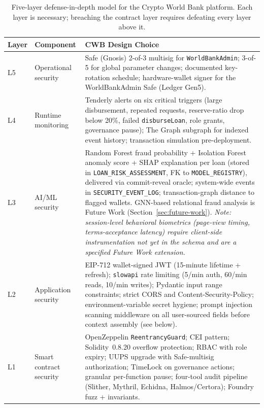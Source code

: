 \documentclass[12pt,a4paper]{report}
\newcommand{\tableheadcolor}{\rowcolor{TableHeadBg}}
\begin{document}
\begin{table}[H]
\centering
\caption[Five-layer defense-in-depth model]{Five-layer defense-in-depth model for the Crypto World Bank platform. Each layer is necessary; breaching the contract layer requires defeating every layer above it.}
\label{tab:defense-layers}
\begin{tabular}{p{1.4cm}p{4.0cm}p{8.5cm}}
\toprule
\tableheadcolor
\textbf{Layer} & \textbf{Component} & \textbf{CWB Design Choice} \\
\midrule
L5 & Operational security & Safe (Gnosis) 2-of-3 multisig for \texttt{WorldBankAdmin}; 3-of-5 for global parameter changes; documented key-rotation schedule; hardware-wallet signer for the WorldBankAdmin Safe (Ledger Gen5). \\
L4 & Runtime monitoring & Tenderly alerts on six critical triggers (large disbursement, repeated requests, reserve-ratio drop below 20\%, failed \texttt{disburseLoan}, role grants, governance pause); The Graph subgraph for indexed event history; transaction simulation pre-deployment. \\
L3 & AI/ML security & Random Forest fraud probability + Isolation Forest anomaly score + SHAP explanation per loan (stored in \texttt{LOAN\_RISK\_ASSESSMENT}, FK to \texttt{MODEL\_REGISTRY}), delivered via commit-reveal oracle; system-wide events in \texttt{SECURITY\_EVENT\_LOG}; transaction-graph distance to flagged wallets. GNN-based relational fraud analysis is Future Work (Section~\ref{sec:future-work}). \textit{Note: session-level behavioral biometrics (page-view timing, terms-acceptance latency) require client-side instrumentation not yet in the schema and are a specified Future Work extension.} \\
L2 & Application security & EIP-712 wallet-signed JWT (15-minute lifetime + refresh); \texttt{slowapi} rate limiting (5/min auth, 60/min reads, 10/min writes); Pydantic input range constraints; strict CORS and Content-Security-Policy; environment-variable secret hygiene; prompt injection scanning middleware on all user-sourced fields before context assembly (see below). \\
L1 & Smart contract security & OpenZeppelin \texttt{ReentrancyGuard}; CEI pattern; Solidity~0.8.20 overflow protection; RBAC with role expiry; UUPS upgrade with Safe-multisig authorization; TimeLock on governance actions; granular per-function pause; four-tool audit pipeline (Slither, Mythril, Echidna, Halmos/Certora); Foundry fuzz + invariants. \\
\bottomrule
\end{tabular}
\end{table}
\end{document}

